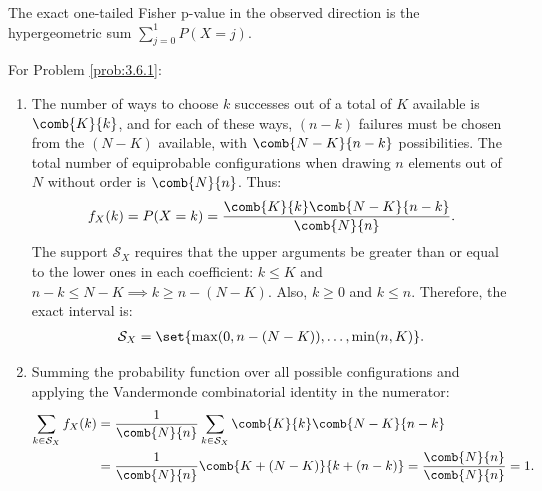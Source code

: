\begin{sugerencia}
	The exact one-tailed Fisher p-value in the observed direction is the hypergeometric sum $\sum_{j=0}^{1} P(X=j)$.
\end{sugerencia}


\begin{solucion}
	\label{sol:3.6.1}
	For Problem \ref{prob:3.6.1}:
	\begin{enumerate}
		\item The number of ways to choose $k$ successes out of a total of $K$ available is $\comb{K}{k}$, and for each of these ways, $(n-k)$ failures must be chosen from the $(N-K)$ available, with $\comb{N-K}{n-k}$ possibilities. The total number of equiprobable configurations when drawing $n$ elements out of $N$ without order is $\comb{N}{n}$. Thus:
		\begin{align*}
			f_X(k) = P(X=k) = \dfrac{\comb{K}{k}\comb{N-K}{n-k}}{\comb{N}{n}}.
		\end{align*}
		The support $\mathcal{S}_X$ requires that the upper arguments be greater than or equal to the lower ones in each coefficient: $k \le K$ and $n-k \le N-K \implies k \ge n-(N-K)$. Also, $k \ge 0$ and $k \le n$. Therefore, the exact interval is:
		\begin{align*}
			\mathcal{S}_X = \set{\max(0, n-(N-K)), \dots, \min(n, K)}.
		\end{align*}
		\item Summing the probability function over all possible configurations and applying the Vandermonde combinatorial identity in the numerator:
		\begin{align*}
			\sum_{k \in \mathcal{S}_X} f_X(k) &= \dfrac{1}{\comb{N}{n}} \sum_{k \in \mathcal{S}_X} \comb{K}{k}\comb{N-K}{n-k} \\
			&= \dfrac{1}{\comb{N}{n}} \comb{K + (N-K)}{k + (n-k)} = \dfrac{\comb{N}{n}}{\comb{N}{n}} = 1.
		\end{align*}
	\end{enumerate}
\end{solucion}

